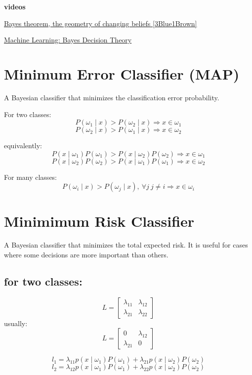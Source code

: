 \documentclass{report}
\begin{document}
\begin{mdframed}
	\textbf{videos}

	\href{https://www.youtube.com/watch?v=HZGCoVF3YvM}{Bayes theorem, the geometry of changing beliefs [3Blue1Brown]}

	\href{https://www.youtube.com/watch?v=4JscUHGWaB4}{Machine Learning: Bayes Decision Theory}
\end{mdframed}

\section{Minimum Error Classifier (MAP)}
A Bayesian classifier that minimizes the classification error probability.

For two classes:
\[P(\omega_1 \mid x) > P(\omega_2 \mid x) \Rightarrow x \in \omega_1\]
\[P(\omega_2 \mid x) > P(\omega_1 \mid x) \Rightarrow x \in \omega_2\]

equivalently:
\[P(x \mid \omega_1)P(\omega_1) > P(x \mid \omega_2)P(\omega_2) \Rightarrow x \in \omega_1\]
\[P(x \mid \omega_2)P(\omega_2) > P(x \mid \omega_1)P(\omega_1) \Rightarrow x \in \omega_2\]

For many classes:
\[P(\omega_i \mid x) > P(\omega_j \mid x),\ \forall j\ j \neq i \Rightarrow x \in \omega_i\]

\section{Minimimum Risk Classifier}
A Bayesian classifier that minimizes the total expected risk. It is useful for cases where some decisions are more important than others.

\subsection*{for two classes:}
\[L = \begin{bmatrix}
	\lambda_{11} & \lambda_{12} \\
	\lambda_{21} & \lambda_{22}
\end{bmatrix}\]
usually:
\[L = \begin{bmatrix}
	0 & \lambda_{12} \\
	\lambda_{21} & 0
\end{bmatrix}\]

\[l_1 = \lambda_{11} p(x \mid \omega_1)P(\omega_1) + \lambda_{21} p(x \mid \omega_2)P(\omega_2)\]
\[l_2 = \lambda_{12} p(x \mid \omega_1)P(\omega_1) + \lambda_{22} p(x \mid \omega_2)P(\omega_2)\]
\end{document}
